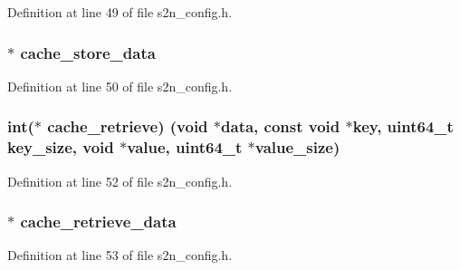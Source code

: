 Definition at line 49 of file s2n\+\_\+config.\+h.

\subsubsection[{\texorpdfstring{cache\+\_\+store\+\_\+data}{cache_store_data}}]{$\ast$ cache\+\_\+store\+\_\+data}\hypertarget{structs2n__config_a239fa5479daf6b4ec8ec1247e4d5d594}{}\label{structs2n__config_a239fa5479daf6b4ec8ec1247e4d5d594}


Definition at line 50 of file s2n\+\_\+config.\+h.

\subsubsection[{\texorpdfstring{cache\+\_\+retrieve}{cache_retrieve}}]{\setlength{\rightskip}{0pt plus 5cm}int($\ast$ cache\+\_\+retrieve) ({\bf void} $\ast$data, const {\bf void} $\ast$key, uint64\+\_\+t key\+\_\+size, {\bf void} $\ast$value, uint64\+\_\+t $\ast$value\+\_\+size)}\hypertarget{structs2n__config_a3dd5ba99f3a9a867c2fea78d660b114a}{}\label{structs2n__config_a3dd5ba99f3a9a867c2fea78d660b114a}


Definition at line 52 of file s2n\+\_\+config.\+h.

\subsubsection[{\texorpdfstring{cache\+\_\+retrieve\+\_\+data}{cache_retrieve_data}}]{$\ast$ cache\+\_\+retrieve\+\_\+data}\hypertarget{structs2n__config_a98a4dc336df5f8d09c3163968a61f6f2}{}\label{structs2n__config_a98a4dc336df5f8d09c3163968a61f6f2}


Definition at line 53 of file s2n\+\_\+config.\+h.

